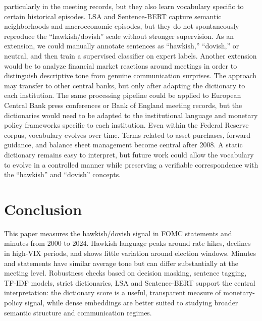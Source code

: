 \documentclass{article}
\begin{document}
particularly in the meeting records, but they also learn vocabulary specific to certain historical episodes. LSA and Sentence-BERT capture semantic neighborhoods and macroeconomic episodes, but they do not spontaneously reproduce 
the ``hawkish/dovish'' scale without stronger supervision. As an extension, we could manually annotate sentences as ``hawkish,'' ``dovish,'' or neutral, and then train a supervised classifier on expert labels. Another 
extension would be to analyze financial market reactions around meetings in order to distinguish descriptive tone from genuine communication surprises.
The approach may transfer to other central banks, but only after adapting the dictionary to each institution. The same processing pipeline could be applied to European Central Bank press conferences or Bank of England meeting 
records, but the dictionaries would need to be adapted to the institutional language and monetary policy frameworks specific to each institution. Even within the Federal Reserve corpus, vocabulary evolves over time. Terms 
related to asset purchases, forward guidance, and balance sheet management become central after 2008. A static dictionary remains easy to interpret, but future work could allow the vocabulary to evolve in a controlled manner 
while preserving a verifiable correspondence with the ``hawkish'' and ``dovish'' concepts.

\section{Conclusion}

This paper measures the hawkish/dovish signal in FOMC statements and minutes from
2000 to 2024. Hawkish language peaks around rate hikes, declines in high-VIX periods, 
and shows little variation around election windows. Minutes and statements have similar average tone but can differ
substantially at the meeting level. Robustness checks based on decision masking,
sentence tagging, TF-IDF models, strict dictionaries, LSA and Sentence-BERT support
the central interpretation: the dictionary score is a useful, transparent measure
of monetary-policy signal, while dense embeddings are better suited to studying
broader semantic structure and communication regimes.


\begingroup
\scriptsize
\setlength{\bibsep}{0pt}


\endgroup
\end{document}

